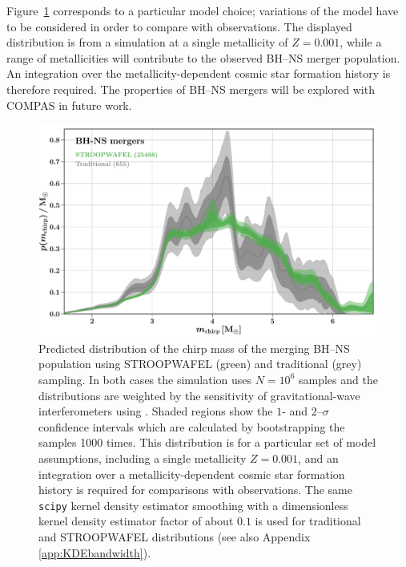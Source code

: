 \documentclass[a4paper,fleqn,usenatbib,useAMS,usedcolumn]{mnras}
\newcommand{\AISs}{\textsc{STROOPWAFEL}}
\begin{document}
Figure~\ref{fig:Mchirpkde} corresponds to a particular model choice; variations of the model have to be considered in order to compare with observations. The displayed distribution is from a simulation at a single metallicity of $Z= 0.001$, while a range of metallicities will contribute to the observed BH--NS merger population. An integration over the metallicity-dependent cosmic star formation history is therefore required.  The properties of BH--NS mergers will be explored with \textsc{COMPAS} in future work. 
%
\begin{figure}
    \includegraphics[width=1\textwidth]{Mchirp_kde.pdf}
    \caption{Predicted distribution of the chirp mass of the merging BH--NS population using \AISs{} (green) and traditional (grey) sampling. In both cases the simulation uses $N= 10^6$ samples and the distributions are weighted by the sensitivity of gravitational-wave interferometers using   \citet{2017ApJ...851L..25F}. Shaded regions show the  $1$- and $2$--$\sigma$ confidence intervals which are calculated by bootstrapping the samples 1000 times.   
This distribution is for a particular set of model assumptions, including a single metallicity $Z = 0.001$, and an integration over a metallicity-dependent cosmic star formation history is required for comparisons with observations. The same \texttt{scipy} kernel density estimator smoothing with a dimensionless kernel density estimator factor of about $0.1 $ is used for traditional and \AISs{} distributions (see also Appendix \ref{app:KDEbandwidth}).}
    \label{fig:Mchirpkde}
\end{figure}
%
\end{document}
